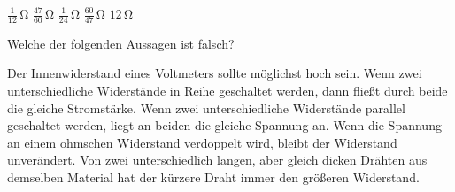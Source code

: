 \documentclass[11pt]{exam}
\begin{document}
\begin{questions}
\begin{choices}
	\choice \(\mathrm{\frac{1}{12}\,\Omega}\)
	\choice \(\mathrm{\frac{47}{60}\,\Omega}\)
	\choice \(\mathrm{\frac{1}{24}\,\Omega}\)
	\choice \(\mathrm{\frac{60}{47}\,\Omega}\)
	\choice \(\mathrm{12\,\Omega}\)
\end{choices}

\vspace{3mm}\question Welche der folgenden Aussagen ist falsch?

\begin{choices}
	\choice Der Innenwiderstand eines Voltmeters sollte möglichst hoch sein.
	\choice Wenn zwei unterschiedliche Widerstände in Reihe geschaltet werden, dann fließt durch beide die gleiche Stromstärke.
	\choice Wenn zwei unterschiedliche Widerstände parallel geschaltet werden, liegt an beiden die gleiche Spannung an.
	\choice Wenn die Spannung an einem ohmschen Widerstand verdoppelt wird, bleibt der Widerstand unverändert.
	\choice Von zwei unterschiedlich langen, aber gleich dicken Drähten aus demselben Material hat der kürzere Draht immer den größeren Widerstand.
\end{choices}

\vspace{3mm}\end{questions}
\end{document}
